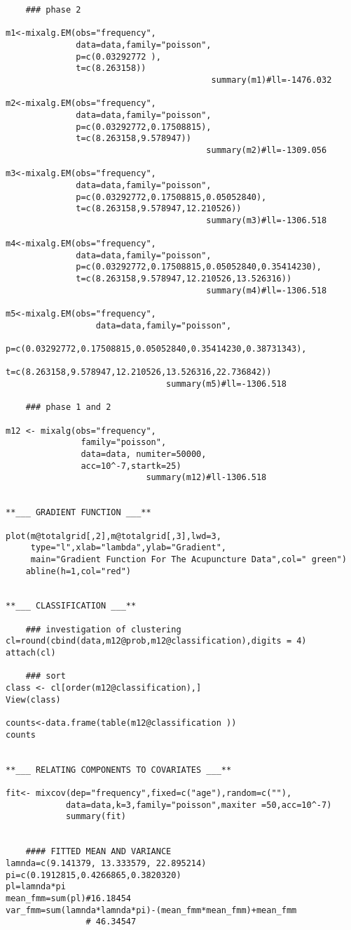 \documentclass[a4paper, 12pt]{article}
\begin{document}
\begin{verbatim}
    ### phase 2

m1<-mixalg.EM(obs="frequency",
              data=data,family="poisson",
              p=c(0.03292772 ),
              t=c(8.263158))
                                         summary(m1)#ll=-1476.032

m2<-mixalg.EM(obs="frequency",
              data=data,family="poisson",
              p=c(0.03292772,0.17508815),
              t=c(8.263158,9.578947))
                                        summary(m2)#ll=-1309.056

m3<-mixalg.EM(obs="frequency",
              data=data,family="poisson",
              p=c(0.03292772,0.17508815,0.05052840),
              t=c(8.263158,9.578947,12.210526))
                                        summary(m3)#ll=-1306.518

m4<-mixalg.EM(obs="frequency",
              data=data,family="poisson",
              p=c(0.03292772,0.17508815,0.05052840,0.35414230),
              t=c(8.263158,9.578947,12.210526,13.526316))
                                        summary(m4)#ll=-1306.518

m5<-mixalg.EM(obs="frequency",
                  data=data,family="poisson",
                  p=c(0.03292772,0.17508815,0.05052840,0.35414230,0.38731343),
                  t=c(8.263158,9.578947,12.210526,13.526316,22.736842))
                                summary(m5)#ll=-1306.518 

    ### phase 1 and 2

m12 <- mixalg(obs="frequency",
               family="poisson",
               data=data, numiter=50000,
               acc=10^-7,startk=25)
                            summary(m12)#ll-1306.518


**___ GRADIENT FUNCTION ___**

plot(m@totalgrid[,2],m@totalgrid[,3],lwd=3,
     type="l",xlab="lambda",ylab="Gradient",
     main="Gradient Function For The Acupuncture Data",col=" green")
    abline(h=1,col="red")


**___ CLASSIFICATION ___**

    ### investigation of clustering
cl=round(cbind(data,m12@prob,m12@classification),digits = 4)
attach(cl)

    ### sort
class <- cl[order(m12@classification),] 
View(class)

counts<-data.frame(table(m12@classification ))
counts


**___ RELATING COMPONENTS TO COVARIATES ___**

fit<- mixcov(dep="frequency",fixed=c("age"),random=c(""),
            data=data,k=3,family="poisson",maxiter =50,acc=10^-7)
            summary(fit)


    #### FITTED MEAN AND VARIANCE
lamnda=c(9.141379, 13.333579, 22.895214)
pi=c(0.1912815,0.4266865,0.3820320)
pl=lamnda*pi
mean_fmm=sum(pl)#16.18454
var_fmm=sum(lamnda*lamnda*pi)-(mean_fmm*mean_fmm)+mean_fmm
                # 46.34547





\end{verbatim}
\newpage
\end{document}
